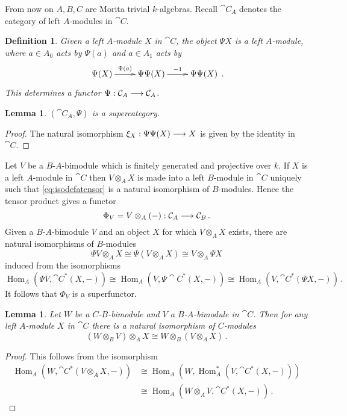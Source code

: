 \documentclass[english,letter paper,12pt,leqno]{article}
\newtheorem{lemma}[theorem]{Lemma}
\theoremstyle{example}
\newtheorem{definition}[theorem]{Definition}
\numberwithin{equation}{section}
\def\Hom{\operatorname{Hom}}
\begin{document}
From now on $A,B,C$ are Morita trivial $k$-algebras. Recall $\cat{C}_A$ denotes the category of left $A$-modules in $\cat{C}$.

\begin{definition}\label{defn:psimodule} Given a left $A$-module $X$ in $\cat{C}$, the object $\Psi X$ is a left $A$-module, where $a \in A_0$ acts by $\Psi(a)$ and $a \in A_1$ acts by
\[
\xymatrix{
\Psi (X) \ar[r]^-{\Psi(a)} & \Psi \Psi (X) \ar[r]^-{-1} & \Psi \Psi (X)
}\,.
\]
This determines a functor $\Psi: \mathcal{C}_A \longrightarrow \mathcal{C}_A$.
\end{definition}

\begin{lemma} $(\cat{C}_A, \Psi)$ is a supercategory.
\end{lemma}
\begin{proof}
The natural isomorphism $\xi_X: \Psi \Psi (X) \longrightarrow X$ is given by the identity in $\cat{C}$.
\end{proof}

Let $V$ be a $B$-$A$-bimodule which is finitely generated and projective over $k$. If $X$ is a left $A$-module in $\cat{C}$ then $V \otimes_A X$ is made into a left $B$-module in $\cat{C}$ uniquely such that \eqref{eq:isodefatensor} is a natural isomorphism of $B$-modules. Hence the tensor product gives a functor
\[
\Phi_V = V \otimes_A (-): \mathcal{C}_A \longrightarrow \mathcal{C}_B\,.
\]
Given a $B$-$A$-bimodule $V$ and an object $X$ for which $V \otimes_A X$ exists, there are natural isomorphisms of $B$-modules
\[
\Psi V \otimes_A X \cong \Psi(V \otimes_A X) \cong V \otimes_A \Psi X
\]
induced from the isomorphisms
\[
\Hom_A( \Psi V, \cat{C}^*(X, -)) \cong \Hom_A( V, \Psi \cat{C}^*(X, -) ) \cong \Hom_A( V, \cat{C}^*(\Psi X, -))\,.
\]
It follows that $\Phi_V$ is a superfunctor.

\begin{lemma}\label{lemma:assoctensor} Let $W$ be a $C$-$B$-bimodule and $V$ a $B$-$A$-bimodule in $\cat{C}$. Then for any left $A$-module $X$ in $\cat{C}$ there is a natural isomorphism of $C$-modules
\[
(W \otimes_B V) \otimes_A X \cong W \otimes_B ( V \otimes_A X )\,.
\]
\end{lemma}
\begin{proof}
This follows from the isomorphism
\begin{align*}
\Hom_A(W, \cat{C}^*(V \otimes_A X, -)) &\cong \Hom_A( W, \Hom_A^*(V, \cat{C}^*(X, -)))\\
&\cong \Hom_A(W \otimes_A V, \cat{C}^*(X, -))\,.
\end{align*}
\end{proof}
\end{document}
